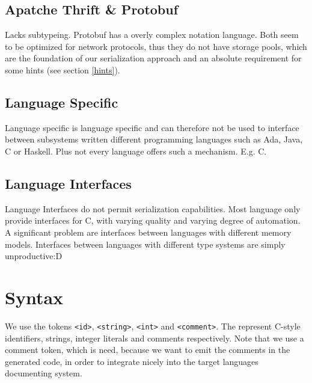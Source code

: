 \documentclass[a4paper,10pt]{article}
\begin{document}
\subsection*{Apatche Thrift \& Protobuf}

Lacks subtypeing. Protobuf has a overly complex notation language. Both seem to be optimized for network protocols, thus they do not have storage pools, which are the foundation of our serialization approach and an absolute requirement for some hints (see section \ref{hints}).


\subsection*{Language Specific}

Language specific is language specific and can therefore not be used to interface between subsystems written different programming languages such as Ada, Java, C or Haskell. Plus not every language offers such a mechanism. E.g. C.


\subsection*{Language Interfaces}
Language Interfaces do not permit serialization capabilities. Most language only provide interfaces for C, with varying quality and varying degree of automation. A significant problem are interfaces between languages with different memory models.
Interfaces between languages with different type systems are simply unproductive:D


\section{Syntax}

We use the tokens \verb/<id>/, \verb/<string>/, \verb/<int>/ and \verb/<comment>/. The represent C-style identifiers, strings, integer literals and comments respectively. Note that we use a comment token, which is need, because we want to emit the comments in the generated code, in order to integrate nicely into the target languages documenting system.
\end{document}
